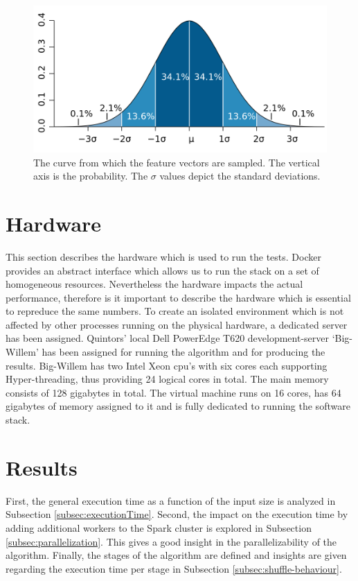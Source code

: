 \begin{figure}[ht!]
\centering
\includegraphics[width=\textwidth]{figures/bellcurve.png}
\caption[Standard normal distribution]{The curve from which the feature vectors are sampled. The vertical axis is the probability. The $\sigma$ values depict the standard deviations. \label{gaussianDistribution}}
\end{figure}

\section{Hardware \label{sec:hardware}}
This section describes the hardware which is used to run the tests. Docker provides an abstract interface which allows us to run the stack on a set of homogeneous resources. Nevertheless the hardware impacts the actual performance, therefore is it important to describe the hardware which is essential to repreduce the same numbers. To create an isolated environment which is not affected by other processes running on the physical hardware, a dedicated server has been assigned. Quintors' local Dell PowerEdge T620 development-server `Big-Willem' has been assigned for running the algorithm and for producing the results. Big-Willem has two Intel Xeon cpu's with six cores each supporting Hyper-threading, thus providing 24 logical cores in total. The main memory consists of 128 gigabytes in total. The virtual machine runs on 16 cores, has 64 gigabytes of memory assigned to it and is fully dedicated to running the software stack.

\section{Results \label{sec:results}}

First, the general execution time as a function of the input size is analyzed in Subsection \ref{subsec:executionTime}. Second, the impact on the execution time by adding additional workers to the Spark cluster is explored in Subsection \ref{subsec:parallelization}. This gives a good insight in the parallelizability of the algorithm. Finally, the stages of the algorithm are defined and insights are given regarding the execution time per stage in Subsection \ref{subsec:shuffle-behaviour}.

